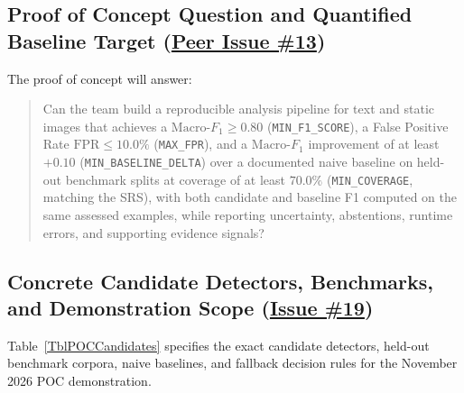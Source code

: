 \documentclass{article}
\begin{document}
\subsection{Proof of Concept Question and Quantified Baseline Target (\href{https://github.com/richy1337/Verity/issues/13}{Peer Issue \#13})}

The proof of concept will answer:
\begin{quote}
Can the team build a reproducible analysis pipeline for text and static images that achieves a $\text{Macro-}F_1 \ge 0.80$ (\texttt{MIN\_F1\_SCORE}), a False Positive Rate $\text{FPR} \le 10.0\%$ (\texttt{MAX\_FPR}), and a $\text{Macro-}F_1$ improvement of at least $\mathbf{+0.10}$ (\texttt{MIN\_BASELINE\_DELTA}) over a documented naive baseline on held-out benchmark splits at coverage of at least $70.0\%$ (\texttt{MIN\_COVERAGE}, matching the SRS), with both candidate and baseline F1 computed on the same assessed examples, while reporting uncertainty, abstentions, runtime errors, and supporting evidence signals?
\end{quote}

\subsection{Concrete Candidate Detectors, Benchmarks, and Demonstration Scope (\href{https://github.com/richy1337/Verity/issues/19}{Issue \#19})}

Table~\ref{TblPOCCandidates} specifies the exact candidate detectors, held-out benchmark corpora, naive baselines, and fallback decision rules for the November 2026 POC demonstration.
\end{document}

